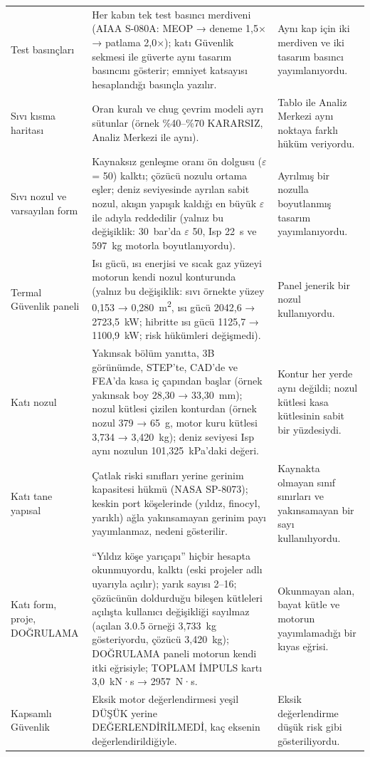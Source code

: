 \documentclass[11pt,a4paper]{article}
\newcommand{\ui}[1]{\textsf{#1}}
\begin{document}
\begin{longtable}{@{}>{\raggedright\arraybackslash}p{3.0cm}>{\raggedright\arraybackslash}p{8.0cm}>{\raggedright\arraybackslash}p{4.6cm}@{}}
Test basınçları & Her kabın tek test basıncı merdiveni (AIAA S-080A: MEOP → deneme 1,5× → patlama 2,0×); katı Güvenlik sekmesi ile güverte aynı tasarım basıncını gösterir; emniyet katsayısı hesaplandığı basınçla yazılır. & Aynı kap için iki merdiven ve iki tasarım basıncı yayımlanıyordu. \\
Sıvı kısma haritası & Oran kuralı ve chug çevrim modeli ayrı sütunlar (örnek \%40--\%70 \ui{KARARSIZ}, Analiz Merkezi ile aynı). & Tablo ile Analiz Merkezi aynı noktaya farklı hüküm veriyordu. \\
Sıvı nozul ve varsayılan form & Kaynaksız genleşme oranı ön dolgusu ($\varepsilon$ = 50) kalktı; çözücü nozulu ortama eşler; deniz seviyesinde ayrılan sabit nozul, akışın yapışık kaldığı en büyük $\varepsilon$ ile adıyla reddedilir (yalnız bu değişiklik: 30~bar'da $\varepsilon$ 50, Isp 22~s ve 597~kg motorla boyutlanıyordu). & Ayrılmış bir nozulla boyutlanmış tasarım yayımlanıyordu. \\
Termal Güvenlik paneli & Isı gücü, ısı enerjisi ve sıcak gaz yüzeyi motorun kendi nozul konturunda (yalnız bu değişiklik: sıvı örnekte yüzey 0,153 → 0,280~m\textsuperscript{2}, ısı gücü 2042,6 → 2723,5~kW; hibritte ısı gücü 1125,7 → 1100,9~kW; risk hükümleri değişmedi). & Panel jenerik bir nozul kullanıyordu. \\
Katı nozul & Yakınsak bölüm yanıtta, 3B görünümde, STEP'te, CAD'de ve FEA'da kasa iç çapından başlar (örnek yakınsak boy 28,30 → 33,30~mm); nozul kütlesi çizilen konturdan (örnek nozul 379 → 65~g, motor kuru kütlesi 3,734 → 3,420~kg); deniz seviyesi Isp aynı nozulun 101,325~kPa'daki değeri. & Kontur her yerde aynı değildi; nozul kütlesi kasa kütlesinin sabit bir yüzdesiydi. \\
Katı tane yapısal & Çatlak riski sınıfları yerine gerinim kapasitesi hükmü (NASA SP-8073); keskin port köşelerinde (yıldız, finocyl, yarıklı) ağla yakınsamayan gerinim payı yayımlanmaz, nedeni gösterilir. & Kaynakta olmayan sınıf sınırları ve yakınsamayan bir sayı kullanılıyordu. \\
Katı form, proje, DOĞRULAMA & ``Yıldız köşe yarıçapı'' hiçbir hesapta okunmuyordu, kalktı (eski projeler adlı uyarıyla açılır); yarık sayısı 2--16; çözücünün doldurduğu bileşen kütleleri açılışta kullanıcı değişikliği sayılmaz (açılan 3.0.5 örneği 3,733~kg gösteriyordu, çözücü 3,420~kg); DOĞRULAMA paneli motorun kendi itki eğrisiyle; \ui{TOPLAM İMPULS} kartı 3,0~kN·s → 2957~N·s. & Okunmayan alan, bayat kütle ve motorun yayımlamadığı bir kıyas eğrisi. \\
Kapsamlı Güvenlik & Eksik motor değerlendirmesi yeşil \ui{DÜŞÜK} yerine \ui{DEĞERLENDİRİLMEDİ}, kaç eksenin değerlendirildiğiyle. & Eksik değerlendirme düşük risk gibi gösteriliyordu. \\

\end{longtable}
\end{document}
